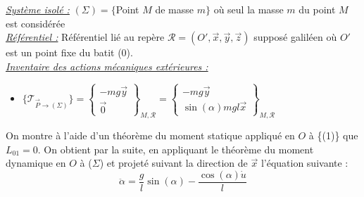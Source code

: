 \documentclass[a4paper]{article}
\begin{document}
                                \underline{\textit{Système isolé :}} $(\Sigma) = \{$Point $M$ de masse $m\}$ où seul la masse $m$ du point $M$ est considérée\\

                                \underline{\textit{Référentiel :}} Référentiel lié au repère $\mathcal{R} = (O',\vec{x}, \vec{y}, \vec{z})$ supposé galiléen
                                où $O'$ est un point fixe du batit (0). \\

                                \underline{\textit{Inventaire des actions mécaniques extérieures :}} \\

                                \begin{itemize}
                                        \item $\{\mathcal{T}_{\overrightarrow{P} \to (\Sigma)} \} = \left\{ 
                                        \begin{array}{cc}
                                                -mg\vec{y} \\
                                                \vec{0}
                                        \end{array} \right\}_{M,\mathcal{R}}
                                        = \left\{
                                        \begin{array}{cc}
                                                -mg\vec{y} \\
                                                \sin (\alpha)mgl\vec{x}
                                        \end{array} \right\}_{M,\mathcal{R}}$
                                \end{itemize}

                                On montre à l'aide d'un théorème du moment statique appliqué en $O$ à \{(1)\} que $L_{01}=0$.
                                On obtient par la suite, en appliquant le théorème du moment dynamique en $O$ à ($\Sigma$) et projeté
                                suivant la direction de $\vec{x}$ l'équation suivante :
                                \begin{equation}
                                        \ddot \alpha = \frac{g}{l}\sin (\alpha) - \frac{\cos (\alpha) \dot u}{l}
                                        \label{eq3}
                                \end{equation}
\end{document}
